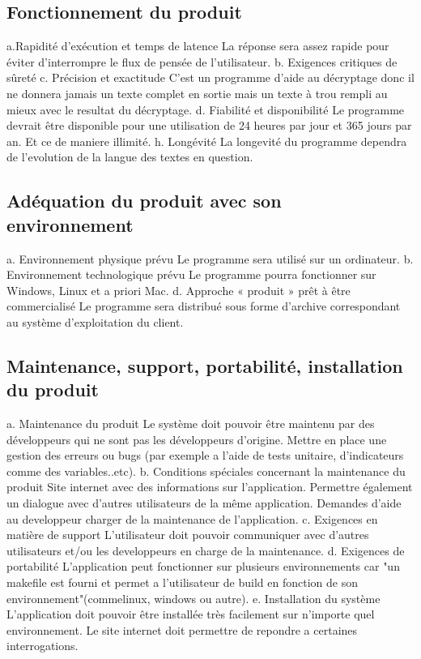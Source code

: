\documentclass[a4]{article}
\begin{document}
		\subsection{Fonctionnement du produit}
		a.Rapidité d’exécution et temps de latence
La réponse sera assez rapide pour éviter d’interrompre le flux de pensée de l’utilisateur.
b. Exigences critiques de sûreté
c. Précision et exactitude
C'est un programme d'aide au décryptage donc il ne donnera jamais un texte complet en sortie mais un texte à trou rempli au mieux avec le resultat du décryptage.
d. Fiabilité et disponibilité
Le programme devrait être disponible pour une utilisation de 24 heures par jour et 365 jours
par an. Et ce de maniere illimité.
h. Longévité
La longevité du programme dependra de l'evolution de la langue des textes en question.

		\subsection{Adéquation du produit avec son environnement}
		a. Environnement physique prévu
Le programme sera utilisé sur un ordinateur.
b. Environnement technologique prévu
Le programme pourra fonctionner sur Windows, Linux et a priori Mac.
d. Approche « produit » prêt à être commercialisé
Le programme sera distribué sous forme d'archive correspondant au système d'exploitation du client.
		\subsection{Maintenance, support, portabilité, installation du produit}
			a. Maintenance du produit
Le système doit pouvoir être maintenu par des développeurs qui ne sont pas les
développeurs d’origine.
Mettre en place une gestion des erreurs ou bugs (par exemple a l'aide de tests unitaire, d'indicateurs comme des variables..etc).
			b. Conditions spéciales concernant la maintenance du produit
Site internet avec des informations sur l'application.
Permettre également un dialogue avec d'autres utilisateurs de la même application.
Demandes d'aide au developpeur charger de la maintenance de l'application.
			c. Exigences en matière de support
L'utilisateur doit pouvoir communiquer avec d'autres utilisateurs et/ou les developpeurs en charge de la maintenance.
			d. Exigences de portabilité
L'application peut fonctionner sur plusieurs environnements car "un makefile est fourni et permet a l'utilisateur de build en fonction de son environnement"(commelinux, windows ou autre).
			e. Installation du système
L'application doit pouvoir être installée très facilement sur n'importe quel environnement.
Le site internet doit permettre de repondre a certaines interrogations.
\end{document}
